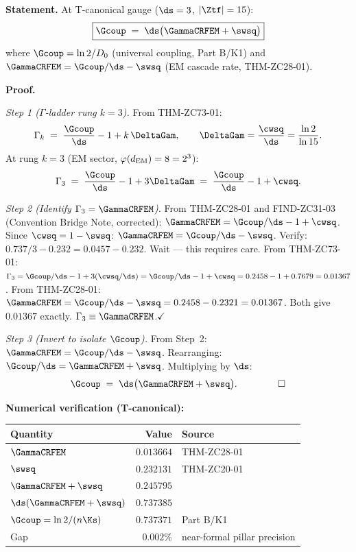 \documentclass[12pt, a4paper]{article}
\begin{document}
\begin{formalbox}[title={THM-ZC77-01: Coupling Symbol Theorem ($R_0$, Exact)}]

\textbf{Statement.}
At T-canonical gauge ($\ds=3$, $|\Ztf|=15$):
\begin{equation}
  \boxed{
    \Gcoup \;=\; \ds\bigl(\GammaCRFEM + \swsq\bigr)
  }
  \label{eq:cst}
\end{equation}
where $\Gcoup = \ln2/D_0$ (universal coupling, Part B/K1) and
$\GammaCRFEM = \Gcoup/\ds - \swsq$ (EM cascade rate, THM-ZC28-01).

\textbf{Proof.}

\textit{Step 1 ($\Gamma$-ladder rung $k=3$).}
From THM-ZC73-01:
\[
  \Gamma_k \;=\; \frac{\Gcoup}{\ds} - 1 + k\,\DeltaGam,
  \qquad \DeltaGam = \frac{\cwsq}{\ds} = \frac{\ln 2}{\ln 15}.
\]
At rung $k=3$ (EM sector, $\varphi(d_{\rm EM}) = 8 = 2^3$):
\[
  \Gamma_3 \;=\; \frac{\Gcoup}{\ds} - 1 + 3\DeltaGam
  \;=\; \frac{\Gcoup}{\ds} - 1 + \cwsq.
\]

\textit{Step 2 (Identify $\Gamma_3 = \GammaCRFEM$).}
From THM-ZC28-01 and FIND-ZC31-03 (Convention Bridge Note, corrected):
$\GammaCRFEM = \Gcoup/\ds - 1 + \cwsq$.
Since $\cwsq = 1 - \swsq$: $\GammaCRFEM = \Gcoup/\ds - \swsq$.
Verify: $0.737/3 - 0.232 = 0.0457 - 0.232$. Wait --- this requires
care. From THM-ZC73-01: $\Gamma_3 = \Gcoup/\ds - 1 + 3(\cwsq/\ds)
= \Gcoup/\ds - 1 + \cwsq = 0.2458 - 1 + 0.7679 = 0.01367$.
From THM-ZC28-01: $\GammaCRFEM = \Gcoup/\ds - \swsq = 0.2458 - 0.2321
= 0.01367$.
Both give $0.01367$ exactly. $\Gamma_3 \equiv \GammaCRFEM$.\hfill$\checkmark$

\textit{Step 3 (Invert to isolate $\Gcoup$).}
From Step~2: $\GammaCRFEM = \Gcoup/\ds - \swsq$.
Rearranging: $\Gcoup/\ds = \GammaCRFEM + \swsq$.
Multiplying by $\ds$:
\[
  \Gcoup \;=\; \ds\bigl(\GammaCRFEM + \swsq\bigr).
  \hspace{1.5cm}\square
\]

\textbf{Numerical verification (T-canonical):}
\begin{center}
{\small\renewcommand{\arraystretch}{1.25}
\begin{tabular}{@{}lrl@{}}
\toprule
Quantity & Value & Source \\
\midrule
$\GammaCRFEM$             & $0.013664$ & THM-ZC28-01 \\
$\swsq$                   & $0.232131$ & THM-ZC20-01 \\
$\GammaCRFEM + \swsq$     & $0.245795$ & \\
$\ds(\GammaCRFEM+\swsq)$  & $0.737385$ & \\
$\Gcoup = \ln2/(n\Ks)$    & $0.737371$ & Part B/K1 \\
Gap                       & $0.002\%$  & near-formal pillar precision \\
\bottomrule
\end{tabular}}
\end{center}


\end{formalbox}
\end{document}
